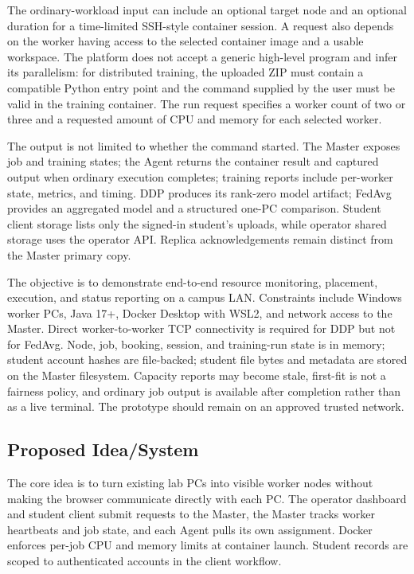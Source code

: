 \documentclass{article}
\begin{document}
The ordinary-workload input can include an optional target node and an optional duration for a time-limited SSH-style container session. A request also depends on the worker having access to the selected container image and a usable workspace. The platform does not accept a generic high-level program and infer its parallelism: for distributed training, the uploaded ZIP must contain a compatible Python entry point and the command supplied by the user must be valid in the training container. The run request specifies a worker count of two or three and a requested amount of CPU and memory for each selected worker.

The output is not limited to whether the command started. The Master exposes job and training states; the Agent returns the container result and captured output when ordinary execution completes; training reports include per-worker state, metrics, and timing. DDP produces its rank-zero model artifact; FedAvg provides an aggregated model and a structured one-PC comparison. Student client storage lists only the signed-in student's uploads, while operator shared storage uses the operator API. Replica acknowledgements remain distinct from the Master primary copy.

The objective is to demonstrate end-to-end resource monitoring, placement, execution, and status reporting on a campus LAN. Constraints include Windows worker PCs, Java 17+, Docker Desktop with WSL2, and network access to the Master. Direct worker-to-worker TCP connectivity is required for DDP but not for FedAvg. Node, job, booking, session, and training-run state is in memory; student account hashes are file-backed; student file bytes and metadata are stored on the Master filesystem. Capacity reports may become stale, first-fit is not a fairness policy, and ordinary job output is available after completion rather than as a live terminal. The prototype should remain on an approved trusted network.

	\subsection{Proposed Idea/System}
The core idea is to turn existing lab PCs into visible worker nodes without making the browser communicate directly with each PC. The operator dashboard and student client submit requests to the Master, the Master tracks worker heartbeats and job state, and each Agent pulls its own assignment. Docker enforces per-job CPU and memory limits at container launch. Student records are scoped to authenticated accounts in the client workflow.
\end{document}
